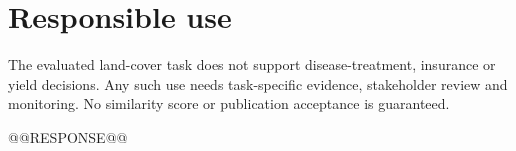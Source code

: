 \documentclass[3p,times,procedia]{elsarticle}
\begin{document}
\section*{Responsible use}
The evaluated land-cover task does not support disease-treatment, insurance or yield decisions. Any such use needs task-specific evidence, stakeholder review and monitoring. No similarity score or publication acceptance is guaranteed.


@@RESPONSE@@
\end{document}
